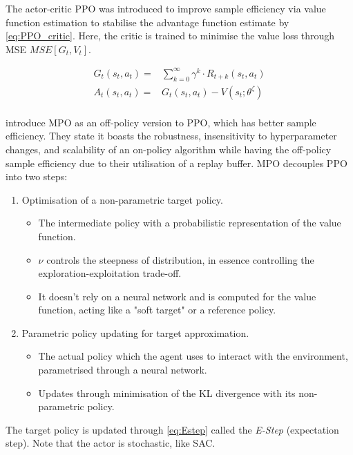 The actor-critic PPO was introduced to improve sample efficiency via value function estimation to stabilise the advantage function estimate by \autoref{eq:PPO_critic}. Here, the critic is trained to minimise the value loss through MSE \(MSE[G_t, V_t]\).

\begin{equation}
\begin{aligned}
    G_t(s_t, a_t) =& \sum_{k=0}^\infty \gamma^k \cdot R_{t+k}(s_t, a_t) \\
    A_t(s_t, a_t) =& G_t(s_t, a_t) - V(s_t; \theta^\zeta) \\
\end{aligned}
\label{eq:PPO_critic}
\end{equation}

\cite{abdolmaleki2018maximum} introduce MPO as an off-policy version to PPO, which has better sample efficiency. They state it boasts the robustness, insensitivity to hyperparameter changes, and scalability of an on-policy algorithm while having the off-policy sample efficiency due to their utilisation of a replay buffer. MPO decouples PPO into two steps:
\begin{enumerate}
    \item Optimisation of a non-parametric target policy.
    \begin{itemize}
        \item The intermediate policy with a probabilistic representation of the value function.
        \item \(\nu\) controls the steepness of distribution, in essence controlling the exploration-exploitation trade-off.
        \item It doesn't rely on a neural network and is computed for the value function, acting like a "soft target" or a reference policy.
    \end{itemize}
    \item Parametric policy updating for target approximation.
    \begin{itemize}
        \item The actual policy which the agent uses to interact with the environment, parametrised through a neural network.
        \item Updates through minimisation of the KL divergence with its non-parametric policy.
    \end{itemize}
\end{enumerate}

The target policy is updated through \autoref{eq:Estep} called the \textit{E-Step} (expectation step). Note that the actor is stochastic, like SAC.

